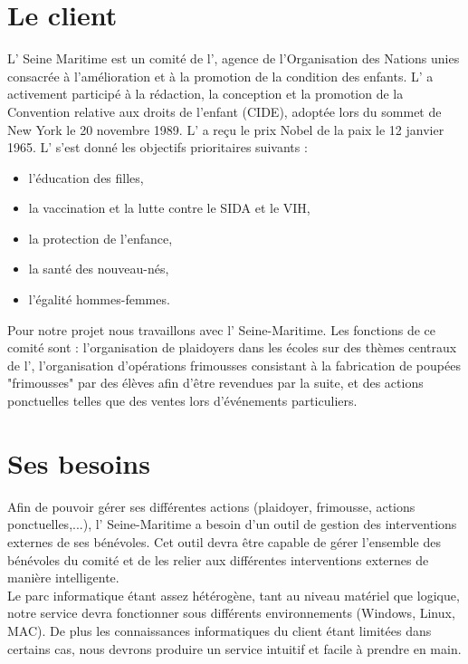 \documentclass[asi]{picInsa}
\begin{document}
\section{Le client}
L'\nomClient{} Seine Maritime est un comité de l'\nomClient{},  agence de l'Organisation des Nations unies consacrée à l'amélioration et à la promotion de la condition des enfants.  L'\nomClient{} a activement participé à la rédaction, la conception et la promotion de la Convention relative aux droits de l'enfant (CIDE), adoptée lors du sommet de New York le 20 novembre 1989. L'\nomClient{} a reçu le prix Nobel de la paix le 12 janvier 1965. L'\nomClient{} s'est donné les objectifs prioritaires suivants :
\begin{itemize}
	\item l'éducation des filles,
	\item la vaccination et la lutte contre le SIDA et le VIH,
	\item la protection de l'enfance,
	\item la santé des nouveau-nés,
	\item l'égalité hommes-femmes\vspace{0.5cm}.
\end{itemize}

Pour notre projet nous travaillons avec l'\nomClient{} Seine-Maritime. Les fonctions de ce comité sont : l'organisation de plaidoyers dans les écoles sur des thèmes centraux de l'\nomClient, l'organisation d'opérations frimousses consistant à la fabrication de poupées "frimousses" par des élèves afin d'être revendues par la suite, et des actions ponctuelles telles que des ventes lors d’événements particuliers.



\section{Ses besoins}
Afin de pouvoir gérer ses différentes actions (plaidoyer, frimousse, actions ponctuelles,...), l'\nomClient{} Seine-Maritime a besoin d'un outil de gestion des interventions externes de ses bénévoles. Cet outil devra être capable de gérer l'ensemble des bénévoles du comité et de les relier aux différentes interventions externes de manière intelligente.\\
Le parc informatique étant assez hétérogène, tant au niveau matériel que logique, notre service devra fonctionner sous différents environnements (Windows, Linux, MAC). De plus les connaissances informatiques du client étant limitées dans certains cas, nous devrons produire un service intuitif et facile à prendre en main.
\end{document}
